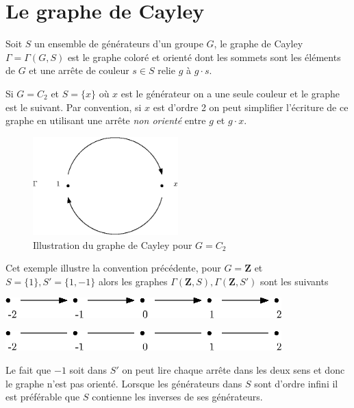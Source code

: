 \documentclass[main.tex]{subfiles}
\begin{document}
	\section{Le graphe de Cayley}
	\begin{definition}
		Soit $S$ un ensemble de générateurs d'un groupe $G$, le graphe de Cayley $\Gamma = \Gamma(G,S)$ est le graphe coloré et orienté dont les sommets sont les éléments de $G$ et une arrête de couleur $s \in S$ relie $g$ à $g\cdot s$. 
	\end{definition}
	\begin{example}
		Si $G = C_2$ et $S = \{x\} $ où $x$ est le générateur on a une seule couleur et le graphe est le suivant. 
		Par convention, si $x$ est d'ordre 2 on peut simplifier l'écriture de ce graphe en utilisant une arrête \emph{non orienté} entre $g$ et $g\cdot x$.
		\begin{figure}[ht]
			\centering
			\includegraphics[width=0.5\textwidth]{cayley.eps}
			\caption{Illustration du graphe de Cayley pour $G = C_{2}$}
		\end{figure}
	\end{example}
	\begin{example}
		Cet exemple illustre la convention précédente, pour $G = \mathbf{Z}$ et $S = \{1\}, S' = \{1,-1\} $ alors les graphes $\Gamma(\mathbf{Z},S), \Gamma(\mathbf{Z},S')$ sont les suivants \\
		\bigskip

		\begin{minipage}{0.5\textwidth}
			\centering
			\includegraphics[width=0.8\textwidth]{cayleyZ.eps}
			\captionof{figure}{$\Gamma(\mathbf{Z},S)$}
		\end{minipage}
		\hfill
		\begin{minipage}{0.5\textwidth}
			\centering
			\includegraphics[width=0.8\textwidth]{cayleyZ2.eps}
			\captionof{figure}{$\Gamma(\mathbf{Z},S')$}
		\end{minipage}
		\bigskip

		Le fait que $-1$ soit dans $S'$ on peut lire chaque arrête dans les deux sens et donc le graphe n'est pas orienté. Lorsque les générateurs dans $S$ sont d'ordre infini il est préférable que $S$ contienne les inverses de ses générateurs.
	\end{example}
\end{document}
